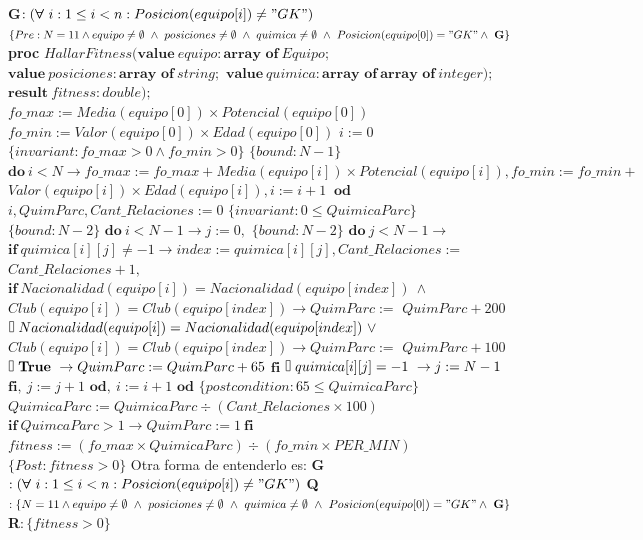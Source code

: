 \documentclass{article}
\begin{document}
\State \textbf{G}{$: (\boldsymbol{\forall} \ i : 1 \leq i < n : Posicion(equipo[i]) \neq "GK" )$}
\State $\{Pre: N = 11 \land equipo \neq \emptyset \ \land \ posiciones \neq \emptyset \ \land \ quimica \neq \emptyset \ \land \ Posicion(equipo[0]) = "GK" \land \ \textbf{G} \}$ 
\State \textbf{proc }{$HallarFitness(\textbf{value} \ equipo : \textbf{array \ of}\ Equipo;$}
\State {} $\textbf{value} \ posiciones : \textbf{array \ of} \ string; $
\State {} $\textbf{value} \ quimica : \textbf{array \ of}\ \textbf{array \ of} \ integer);$
\State {} $\textbf{result} \ fitness : double);$
\State {} $fo\_max := Media(equipo[0]) \times Potencial(equipo[0])$
\State {} $fo\_min := Valor(equipo[0]) \times Edad(equipo[0])$
\State {} $i := 0$
\State {} $\{invariant: fo\_max > 0 \land fo\_min > 0\}$
\State {} $\{bound: N-1\}$
\State {} $\textbf{do}\ i < N \rightarrow fo\_max := fo\_max + Media(equipo[i]) \times Potencial(equipo[i]), fo\_min := fo\_min +$
\State {} $Valor(equipo[i]) \times Edad(equipo[i]), i := i + 1 \  $
\State {} $\textbf{od}$
\State {} $i, QuimParc, Cant\_Relaciones := 0$
\State {} $\{invariant: 0 \leq QuimicaParc\}$
\State {} $\{bound: N-2\}$
\State {} $\textbf{do}\ i < N-1 \rightarrow j := 0, $
\State {} $\{bound: N-2\}$
\State {} $\textbf{do}\ j < N-1 \rightarrow$
\State {} $\textbf{if}\ quimica[i][j] \neq -1 \rightarrow index := quimica[i][j], Cant\_Relaciones := $
\State {} $Cant\_Relaciones + 1, $
\State {} $\textbf{if}\ Nacionalidad(equipo[i]) = Nacionalidad(equipo[index]) \ \land $
\State {} $Club(equipo[i]) = Club(equipo[index])\rightarrow QuimParc := $
\State {} $QuimParc +200$
\State {} $\tikz \draw (0,0) rectangle (0.1,0.25); \ Nacionalidad(equipo[i]) = Nacionalidad(equipo[index]) \ \lor $
\State {} $Club(equipo[i]) = Club(equipo[index])\rightarrow QuimParc := $
\State {} $QuimParc +100$
\State {} $\tikz \draw (0,0) rectangle (0.1,0.25); \ \textbf{True} \ \rightarrow QuimParc := QuimParc +65$
\State {} $\textbf{fi}$
\State {} $\tikz \draw (0,0) rectangle (0.1,0.25); \ quimica[i][j] = -1 \ \rightarrow j := N-1$
\State {} $\textbf{fi}, \ j := j + 1$
\State {} $\textbf{od}, \ i := i + 1$
\State {} $\textbf{od}$
\State {} $\{postcondition: 65 \leq QuimicaParc\}$
\State {} $QuimicaParc := QuimicaParc \div (Cant\_Relaciones \times 100)$
\State {} $\textbf{if} \ QuimcaParc > 1 \rightarrow QuimParc := 1 \ \textbf{fi}$
\State {} $fitness := (fo\_max \times QuimicaParc) \div (fo\_min \times PER\_MIN)$
\State $\{Post: fitness > 0\}$
\State
\State Otra forma de entenderlo es:
\State \textbf{G}{$: (\boldsymbol{\forall} \ i : 1 \leq i < n : Posicion(equipo[i]) \neq "GK" )$}
\State \textbf{Q}{$: \{N = 11 \land equipo \neq \emptyset \ \land \ posiciones \neq \emptyset \ \land \ quimica \neq \emptyset \ \land \ Posicion(equipo[0]) = "GK" \land \ \textbf{G} \}$}
\State \textbf{R}{$: \{fitness > 0\}$}
\end{document}
